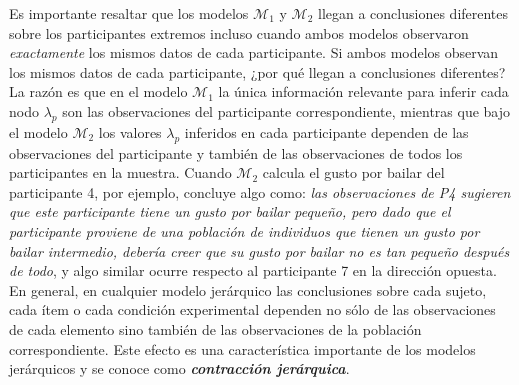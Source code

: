 \documentclass{article}
\begin{document}
\indent Es importante resaltar que los modelos $\mathcal M_1$ y $\mathcal M_2$ llegan a conclusiones diferentes sobre los participantes extremos incluso cuando ambos modelos observaron \emph{exactamente} los mismos datos de cada participante. Si ambos modelos observan los mismos datos de cada participante, ¿por qué llegan a conclusiones diferentes? La razón es que en el modelo $\mathcal M_1$ la única información relevante para inferir cada nodo $\lambda_p$ son las observaciones del participante correspondiente, mientras que bajo el modelo $\mathcal M_2$ los valores $\lambda_p$ inferidos en cada participante dependen de las observaciones del participante y también de las observaciones de todos los participantes en la muestra. Cuando $\mathcal M_2$ calcula el gusto por bailar del participante 4, por ejemplo, concluye algo como: \emph{las observaciones de P4 sugieren que este participante tiene un gusto por bailar pequeño, pero dado que el participante proviene de una población de individuos que tienen un gusto por bailar intermedio, debería creer que su gusto por bailar no es tan pequeño después de todo}, y algo similar ocurre respecto al participante 7 en la dirección opuesta. En general, en cualquier modelo jerárquico las conclusiones sobre cada sujeto, cada ítem o cada condición experimental dependen no sólo de las observaciones de cada elemento sino también de las observaciones de la población correspondiente. Este efecto es una característica importante de los modelos jerárquicos y se conoce como \emph{\textbf{contracción jerárquica}}. \\
\end{document}
